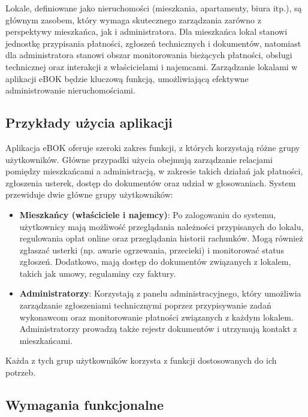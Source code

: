 Lokale, definiowane jako nieruchomości (mieszkania, apartamenty, biura itp.), są głównym zasobem, który wymaga skutecznego zarządzania zarówno z perspektywy mieszkańca, jak i administratora. Dla mieszkańca lokal stanowi jednostkę przypisania płatności, zgłoszeń technicznych i dokumentów, natomiast dla administratora stanowi obszar monitorowania bieżących płatności, obsługi technicznej oraz interakcji z właścicielami i najemcami. Zarządzanie lokalami w aplikacji eBOK będzie kluczową funkcją, umożliwiającą efektywne administrowanie nieruchomościami.

\subsection{Przykłady użycia aplikacji}

Aplikacja eBOK oferuje szeroki zakres funkcji, z których korzystają różne grupy użytkowników. Główne przypadki użycia obejmują zarządzanie relacjami pomiędzy mieszkańcami a administracją, w zakresie takich działań jak płatności, zgłoszenia usterek, dostęp do dokumentów oraz udział w głosowaniach. System przewiduje dwie główne grupy użytkowników:

\begin{itemize} 
	\item \textbf{Mieszkańcy (właściciele i najemcy)}: Po zalogowaniu do systemu, użytkownicy mają możliwość przeglądania należności przypisanych do lokalu, regulowania opłat online oraz przeglądania historii rachunków. Mogą również zgłaszać usterki (np. awarie ogrzewania, przecieki) i monitorować status zgłoszeń. Dodatkowo, mają dostęp do dokumentów związanych z lokalem, takich jak umowy, regulaminy czy faktury.
	
	\item \textbf{Administratorzy}: Korzystają z panelu administracyjnego, który umożliwia zarządzanie zgłoszeniami technicznymi poprzez przypisywanie zadań wykonawcom oraz monitorowanie płatności związanych z każdym lokalem. Administratorzy prowadzą także rejestr dokumentów i utrzymują kontakt z mieszkańcami.

\end{itemize}

Każda z tych grup użytkowników korzysta z funkcji dostosowanych do ich potrzeb.

\subsection{Wymagania funkcjonalne}

